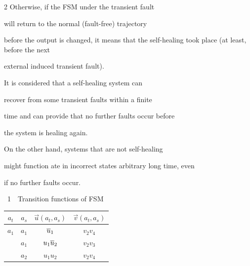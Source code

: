 \begin{multicols}{2}
Otherwise, if the FSM under the transient fault

will return to the normal (fault-free) trajectory

before the output is changed, it means that the self-healing took place (at least, before the next

external induced transient fault).



It is considered that a self-healing system can

recover from some transient faults within a finite

time and can provide that no further faults occur before

the system is healing again.

On the other hand, systems that are not self-healing

might function ate in incorrect states arbitrary long time, even

if no further faults occur.



\pagebreak



\noindent

\begin{center} %


{{\tablename~1}\ \ \small{Transition functions of FSM}}

\vspace*{2ex}



{\small

\tabcolsep=9pt

\begin{tabular}{cccc}

\hline

 $a_t$  & $a_s$  & $\vec{u}(a_t,a_s)$ & $\vec v(a_t,a_s)$     \\

\hline

 $a_1$  &  $a_1$  & $\overline u_1$        & $v_2v_4$         \\


            & $a_1$  & $u_1\overline u_2$     & $v_2v_3$         \\


            &  $a_2$  & $u_1u_2$     & $v_2v_4$         \\


\end{tabular}}
\end{center}
\end{multicols}
